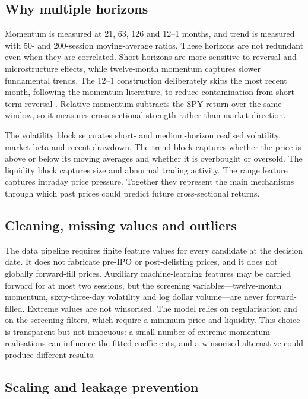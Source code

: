 \documentclass[11pt,a4paper]{article}
\begin{document}
\subsection{Why multiple horizons}

Momentum is measured at 21, 63, 126 and 12--1 months, and trend is measured with 50- and 200-session moving-average ratios. These horizons are not redundant even when they are correlated. Short horizons are more sensitive to reversal and microstructure effects, while twelve-month momentum captures slower fundamental trends. The 12--1 construction deliberately skips the most recent month, following the momentum literature, to reduce contamination from short-term reversal \citep{jegadeesh1993}. Relative momentum subtracts the SPY return over the same window, so it measures cross-sectional strength rather than market direction.

The volatility block separates short- and medium-horizon realised volatility, market beta and recent drawdown. The trend block captures whether the price is above or below its moving averages and whether it is overbought or oversold. The liquidity block captures size and abnormal trading activity. The range feature captures intraday price pressure. Together they represent the main mechanisms through which past prices could predict future cross-sectional returns.

\subsection{Cleaning, missing values and outliers}

The data pipeline requires finite feature values for every candidate at the decision date. It does not fabricate pre-IPO or post-delisting prices, and it does not globally forward-fill prices. Auxiliary machine-learning features may be carried forward for at most two sessions, but the screening variables---twelve-month momentum, sixty-three-day volatility and log dollar volume---are never forward-filled. Extreme values are not winsorised. The model relies on regularisation and on the screening filters, which require a minimum price and liquidity. This choice is transparent but not innocuous: a small number of extreme momentum realisations can influence the fitted coefficients, and a winsorised alternative could produce different results.

\subsection{Scaling and leakage prevention}
\end{document}
